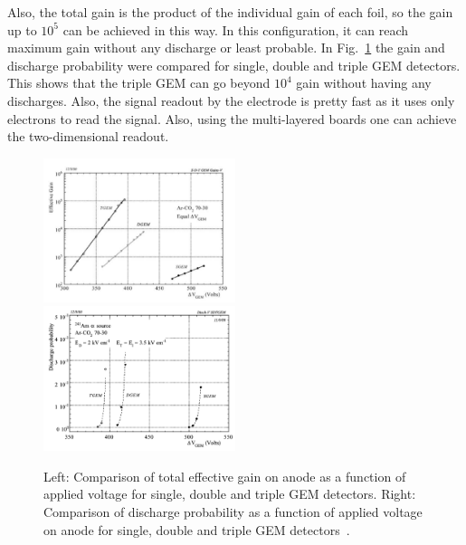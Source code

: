 Also, the total gain is the product of the individual gain of each foil, so the gain up to $10^5$ can be achieved in this way.
In this configuration, it can reach maximum gain without any discharge or least probable.
In Fig.~\ref{fig:tripleGEM_discharge_gain} the gain and discharge probability were compared for single, double and triple GEM detectors. This shows that the triple GEM can go beyond $10^4$ gain without having any discharges.
Also, the signal readout by the electrode is pretty fast as it uses only electrons to read the signal. 
Also, using the multi-layered boards one can achieve the two-dimensional readout.
\begin{figure}[!htbp]
    \centering
    \includegraphics[width=0.5\textwidth]{figures/GEM/Comp_threeGEMS_Gain.png}%
    \includegraphics[width=0.5\textwidth]{figures/GEM/Comp_threeGEMS_DischargeProbability.png}
    \caption{Left: Comparison of total effective gain on anode as a function of applied voltage for single, double and triple GEM detectors. Right: Comparison of discharge probability as a function of applied voltage on anode for single, double and triple GEM detectors~\cite{Bachmann2002}.}
    \label{fig:tripleGEM_discharge_gain}
\end{figure}


